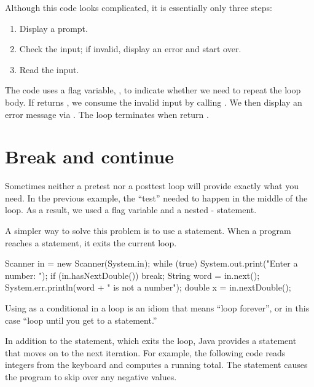 Although this code looks complicated, it is essentially only three steps:

\begin{enumerate}
\item Display a prompt.
\item Check the input; if invalid, display an error and start over.
\item Read the input.
\end{enumerate}


The code uses a flag variable, , to indicate whether we need to repeat the loop body.
If  returns , we consume the invalid input by calling .
We then display an error message via .
The loop terminates when  return .


\section{Break and continue}

Sometimes neither a pretest nor a posttest loop will provide exactly what you need.
In the previous example, the ``test'' needed to happen in the middle of the loop.
As a result, we used a flag variable and a nested - statement.


A simpler way to solve this problem is to use a  statement.
When a program reaches a  statement, it exits the current loop.

\begin{code}
Scanner in = new Scanner(System.in);
while (true) {
    System.out.print("Enter a number: ");
    if (in.hasNextDouble()) {
        break;
    }
    String word = in.next();
    System.err.println(word + " is not a number");
}
double x = in.nextDouble();
\end{code}

Using  as a conditional in a  loop is an idiom that means ``loop forever'', or in this case ``loop until you get to a  statement.''


In addition to the  statement, which exits the loop, Java provides a  statement that moves on to the next iteration.
For example, the following code reads integers from the keyboard and computes a running total.
The  statement causes the program to skip over any negative values.

